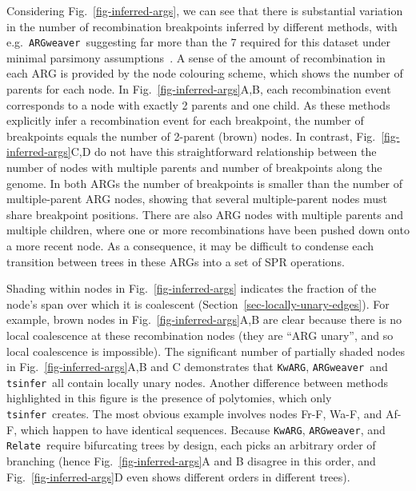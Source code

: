 \documentclass{article}
\newcommand{\noderef}[1]{\textsf{#1}}
\newcommand{\tsinfer}[0]{\texttt{tsinfer}}
\newcommand{\kwarg}[0]{\texttt{KwARG}}
\newcommand{\argweaver}[0]{\texttt{ARGweaver}}
\newcommand{\relate}[0]{\texttt{Relate}}
\begin{document}
Considering Fig.~\ref{fig-inferred-args}, we can see that
there is substantial variation in the number of recombination breakpoints
inferred by different methods, with e.g.~\argweaver\ suggesting
far more than the 7 required for this dataset under minimal parsimony
assumptions~\citep{song2003parsimonious}.
A sense of the amount of recombination in each ARG is provided by
the node colouring scheme, which shows the number of parents for each node.
In Fig.~\ref{fig-inferred-args}A,B, each recombination event
corresponds to a node with exactly 2 parents and one child.
As these methods explicitly infer a recombination event for each
breakpoint, the number of breakpoints equals the number of 2-parent
(brown) nodes.
In contrast, Fig.~\ref{fig-inferred-args}C,D do not have this
straightforward
relationship between the number of nodes with multiple parents
and number of breakpoints along the genome.
In both ARGs the number of breakpoints is smaller
than the number of multiple-parent ARG nodes, showing
that several multiple-parent nodes must share breakpoint positions.
There are also ARG nodes with multiple parents and multiple children,
where one or more recombinations have been pushed down onto a
more recent node.
As a consequence, it may be difficult to condense each transition between trees
in these ARGs into a set of SPR operations.

Shading within nodes in Fig.~\ref{fig-inferred-args} indicates the
fraction of the node's span over which it is coalescent
(Section~\ref{sec-locally-unary-edges}). For example, brown nodes
in Fig.~\ref{fig-inferred-args}A,B are clear because there is
no local coalescence at these recombination nodes
(they are ``ARG unary'', and so local coalescence is impossible).
The significant number of partially shaded nodes in
Fig.~\ref{fig-inferred-args}A,B and C demonstrates that
\kwarg, \argweaver\ and \tsinfer\ all contain locally unary nodes.
Another difference between methods highlighted in this figure
is the presence of polytomies, which only
\tsinfer\ creates. The most obvious example
involves nodes \noderef{Fr-F}, \noderef{Wa-F}, and \noderef{Af-F},
which happen to have identical sequences.
Because \kwarg, \argweaver, and \relate\ require
bifurcating trees by design, each picks an arbitrary order of branching
(hence Fig.~\ref{fig-inferred-args}A and B disagree
in this order, and Fig.~\ref{fig-inferred-args}D even shows different
orders in different trees).
\end{document}
